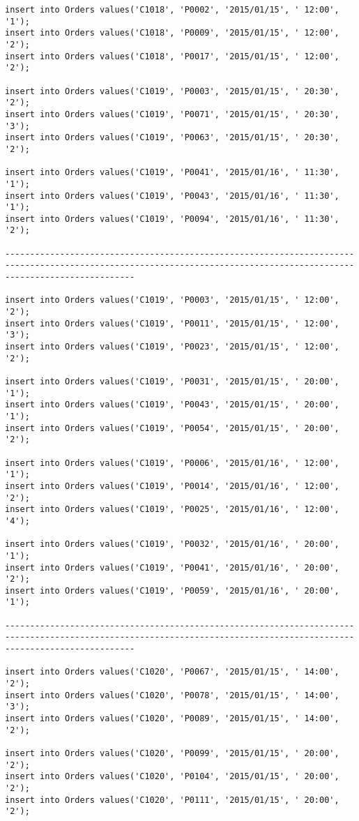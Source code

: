 \documentclass[a4,12pt]{report}
\begin{document}
\begin{lstlisting}
insert into Orders values('C1018', 'P0002', '2015/01/15', ' 12:00', '1');
insert into Orders values('C1018', 'P0009', '2015/01/15', ' 12:00', '2');
insert into Orders values('C1018', 'P0017', '2015/01/15', ' 12:00', '2');

insert into Orders values('C1019', 'P0003', '2015/01/15', ' 20:30', '2');
insert into Orders values('C1019', 'P0071', '2015/01/15', ' 20:30', '3');
insert into Orders values('C1019', 'P0063', '2015/01/15', ' 20:30', '2');

insert into Orders values('C1019', 'P0041', '2015/01/16', ' 11:30', '1');
insert into Orders values('C1019', 'P0043', '2015/01/16', ' 11:30', '1');
insert into Orders values('C1019', 'P0094', '2015/01/16', ' 11:30', '2');

----------------------------------------------------------------------------------------------------------------------------------------------------------------------

insert into Orders values('C1019', 'P0003', '2015/01/15', ' 12:00', '2');
insert into Orders values('C1019', 'P0011', '2015/01/15', ' 12:00', '3');
insert into Orders values('C1019', 'P0023', '2015/01/15', ' 12:00', '2');

insert into Orders values('C1019', 'P0031', '2015/01/15', ' 20:00', '1');
insert into Orders values('C1019', 'P0043', '2015/01/15', ' 20:00', '1');
insert into Orders values('C1019', 'P0054', '2015/01/15', ' 20:00', '2');

insert into Orders values('C1019', 'P0006', '2015/01/16', ' 12:00', '1');
insert into Orders values('C1019', 'P0014', '2015/01/16', ' 12:00', '2');
insert into Orders values('C1019', 'P0025', '2015/01/16', ' 12:00', '4');

insert into Orders values('C1019', 'P0032', '2015/01/16', ' 20:00', '1');
insert into Orders values('C1019', 'P0041', '2015/01/16', ' 20:00', '2');
insert into Orders values('C1019', 'P0059', '2015/01/16', ' 20:00', '1');

----------------------------------------------------------------------------------------------------------------------------------------------------------------------

insert into Orders values('C1020', 'P0067', '2015/01/15', ' 14:00', '2');
insert into Orders values('C1020', 'P0078', '2015/01/15', ' 14:00', '3');
insert into Orders values('C1020', 'P0089', '2015/01/15', ' 14:00', '2');

insert into Orders values('C1020', 'P0099', '2015/01/15', ' 20:00', '2');
insert into Orders values('C1020', 'P0104', '2015/01/15', ' 20:00', '2');
insert into Orders values('C1020', 'P0111', '2015/01/15', ' 20:00', '2');


\end{lstlisting}
\end{document}
